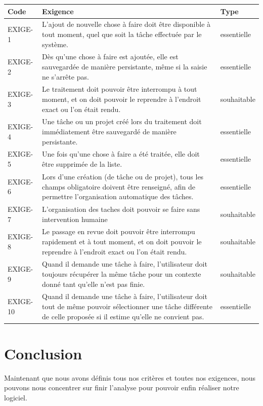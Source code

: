 \begin{center}
\begin{tabular}{|p{1.7cm}|p{8cm}|p{1.7cm}|}
\hline
Code & Exigence & Type\\
\hline
EXIGE-1 & L'ajout de nouvelle chose à faire doit être disponible à tout moment, quel que soit la tâche effectuée par le système. & essentielle\\
\hline
EXIGE-2 & Dès qu'une chose à faire est ajoutée, elle est sauvegardée de manière persistante, même si la saisie ne s'arrête pas. & essentielle\\
\hline
EXIGE-3 & Le traitement doit pouvoir être interrompu à tout moment, et on doit pouvoir le reprendre à l'endroit exact ou l'on était rendu. & souhaitable\\
\hline
EXIGE-4 & Une tâche ou un projet créé lors du traitement doit immédiatement être sauvegardé de manière persistante. & essentielle\\
\hline
EXIGE-5 & Une fois qu'une chose à faire a été traitée, elle doit être supprimée de la liste. & essentielle\\
\hline
EXIGE-6 & Lors d'une création (de tâche ou de projet), tous les champs obligatoire doivent être renseigné, afin de permettre l'organisation automatique des tâches. & essentielle\\
\hline
EXIGE-7 & L'organisation des taches doit pouvoir se faire sans intervention humaine & souhaitable\\
\hline
EXIGE-8 & Le passage en revue doit pouvoir être interrompu rapidement et à tout moment, et on doit pouvoir le reprendre à l'endroit exact ou l'on était rendu. & souhaitable\\
\hline
EXIGE-9 & Quand il demande une tâche à faire, l'utilisateur doit toujours récupérer la même tâche pour un contexte donné tant qu'elle n'est pas finie. & souhaitable\\
\hline
EXIGE-10 & Quand il demande une tâche à faire, l'utilisateur doit tout de même pouvoir sélectionner une tâche différente de celle proposée si il estime qu'elle ne convient pas. & essentielle\\
\hline
\end{tabular}
\end{center}


\section{Conclusion}

Maintenant que nous avons définis tous nos critères et toutes nos exigences, nous pouvons nous concentrer sur finir l'analyse pour pouvoir enfin réaliser notre logiciel.
